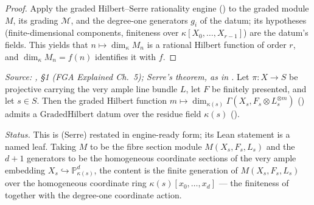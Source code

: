 \begin{proof}
  \leanok
  Apply the graded Hilbert--Serre rationality engine
  () to the graded module \(M\), its
  grading \(\mathcal{M}\), and the degree-one generators \(g_i\) of the datum;
  its hypotheses (finite-dimensional components, finiteness over
  \(\kappa[X_0,\dots,X_{r-1}]\)) are the datum's fields.  This yields that
  \(n \mapsto \dim_\kappa M_n\) is a rational Hilbert function of order \(r\), and
  \(\dim_\kappa M_n = f(n)\) identifies it with \(f\).
\end{proof}

\begin{lemma}
  \label{lem:gradedHilbert_fiber}
  \leanok
  \textit{Source: \cite{nitsure-hilbert-quot}, \S 1 (FGA Explained Ch.~5); Serre's theorem, as in
  .}
  Let \(\pi : X \to S\) be projective carrying the very ample line bundle \(L\),
  let \(F\) be finitely presented, and let \(s \in S\).  Then the graded Hilbert
  function \(m \mapsto \dim_{\kappa(s)} \Gamma(X_s, F_s \otimes L_s^{\otimes m})\)
  () admits a \(\mathrm{GradedHilbert}\) datum over
  the residue field \(\kappa(s)\) ().

  \emph{Status.} This is  (Serre) restated in
  engine-ready form; its Lean statement is a named leaf.  Taking \(M\) to be the
  fibre section module \(M(X_s, F_s, L_s)\) and the \(d+1\) generators to be the
  homogeneous coordinate sections of the very ample embedding
  \(X_s \hookrightarrow \mathbb{P}^d_{\kappa(s)}\), the content is the finite
  generation of \(M(X_s, F_s, L_s)\) over the homogeneous coordinate ring
  \(\kappa(s)[x_0, \dots, x_d]\) --- the finiteness of
   together with the degree-one coordinate
  action.
\end{lemma}

